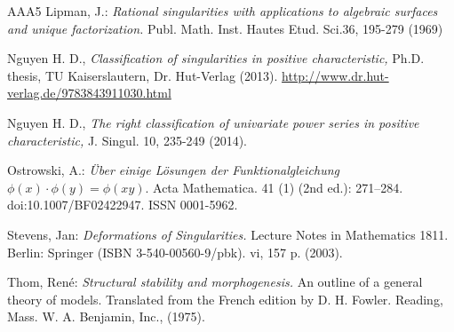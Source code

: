 \documentclass[11pt]{article}
\begin{document}
\begin{thebibliography}{AAA5}
 Lipman, J.: {\it Rational singularities with applications to algebraic surfaces and unique factorization.} Publ. Math. Inst. Hautes Etud. Sci.36, 195-279 (1969)

 Nguyen H. D., {\em Classification of singularities in positive characteristic,} Ph.D. thesis, TU Kaiserslautern, Dr. Hut-Verlag (2013). \url{http://www.dr.hut-verlag.de/9783843911030.html}
 
  Nguyen H. D., {\em The right classification of univariate power series in positive characteristic,} J. Singul. 10, 235-249 (2014). 
 
 Ostrowski, A.:  {\em \"Uber einige L\"osungen der Funktionalgleichung $\phi(x)\cdot\phi(y)=\phi(xy)$}. Acta Mathematica. 41 (1) (2nd ed.): 271–284. doi:10.1007/BF02422947. ISSN 0001-5962.
 
 Stevens, Jan:
{\it Deformations of Singularities.}
Lecture Notes in Mathematics 1811. Berlin: Springer (ISBN 3-540-00560-9/pbk). vi, 157 p. (2003). 

 Thom, René:
{\it Structural stability and morphogenesis.} An outline of a general theory of models. Translated from the French edition by D. H. Fowler. Reading, Mass. W. A. Benjamin, Inc.,  (1975).

\end{thebibliography}
\end{document}
